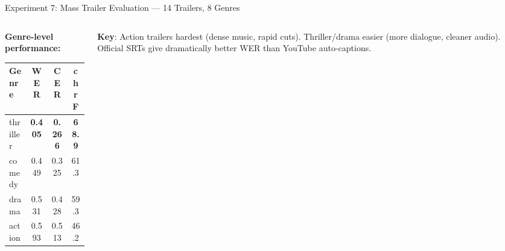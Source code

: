 \documentclass[aspectratio=169]{beamer}
\begin{document}
\begin{frame}{Experiment 7: Mass Trailer Evaluation — 14 Trailers, 8 Genres}
  \begin{columns}[T]
    \begin{column}{0.5\textwidth}
      \textbf{Genre-level performance:}
      \begin{center}
        \scriptsize
        \begin{tabular}{@{}lccc@{}}
          \toprule
          Genre & WER & CER & chrF \\
          \midrule
          thriller & \textbf{0.405} & \textbf{0.266} & \textbf{68.9} \\
          comedy & 0.449 & 0.325 & 61.3 \\
          drama & 0.531 & 0.428 & 59.3 \\
          action & 0.593 & 0.513 & 46.2 \\
          \bottomrule
        \end{tabular}
      \end{center}
    \end{column}
    \begin{column}{0.48\textwidth}
      \small
      \textbf{Key}: Action trailers hardest (dense music, rapid cuts). Thriller/drama easier (more dialogue, cleaner audio). Official SRTs give dramatically better WER than YouTube auto-captions.
    \end{column}
  \end{columns}
\end{frame}
\end{document}
